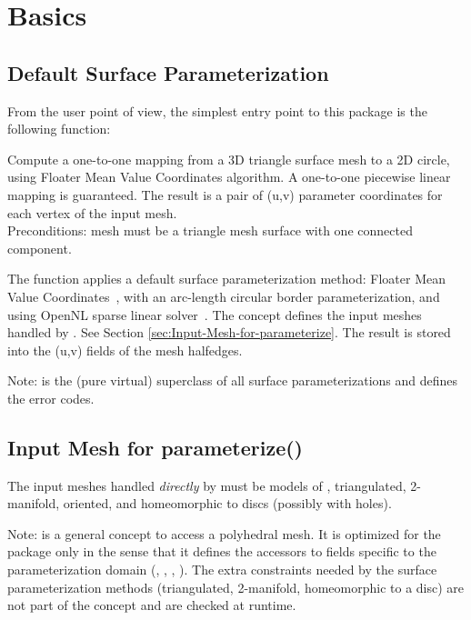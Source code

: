 \section{Basics}


\subsection{Default Surface Parameterization}

From the user point of view, the simplest entry point to this package
is the following function:

{
Compute a one-to-one mapping from a 3D triangle surface mesh to a 2D circle, using Floater Mean Value Coordinates algorithm. A one-to-one piecewise linear mapping is guaranteed. The result is a pair of (u,v) parameter coordinates for each vertex of the input mesh.\\
Preconditions: mesh must be a triangle mesh surface with one connected component.}

The function  applies a default surface parameterization
method: Floater Mean Value Coordinates~\cite{cgal:f-mvc-03}, with an
arc-length circular border parameterization, and using OpenNL sparse
linear solver~\cite{cgal:l-nmdgp-05}. The  concept defines the input meshes handled by . See Section \ref{sec:Input-Mesh-for-parameterize}. The result is stored into the (u,v) fields of the mesh halfedges.

Note:  is the (pure virtual) superclass of all surface parameterizations and defines the error codes.


\subsection{Input Mesh for parameterize() \label{sec:Input-Mesh-for-parameterize}}

The input meshes handled \emph{directly} by  must be models of , triangulated, 2-manifold, oriented, and homeomorphic to discs (possibly with holes).

Note:  is a general concept to access a
polyhedral mesh. It is optimized for the  package
only in the sense that it
defines the accessors to fields specific to the parameterization domain
(, , , ).
The extra constraints  needed by the surface parameterization methods (triangulated,
2-manifold, homeomorphic to a disc) are not part of the concept and
are checked at runtime.

